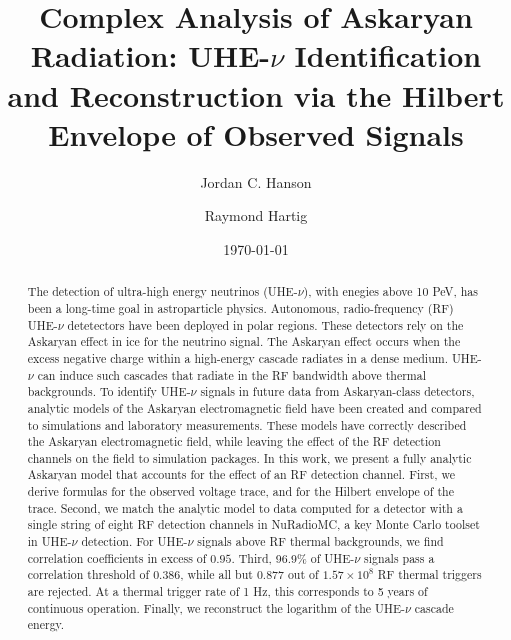 \documentclass[amsmath,amssymb,aps,prd,10pt,twocolumn,showkeys]{revtex4}
\begin{document}
\title{Complex Analysis of Askaryan Radiation: UHE-$\nu$ Identification and Reconstruction via the Hilbert Envelope of Observed Signals}

\author{Jordan C. Hanson}
\author{Raymond Hartig}
\date{\today}

\begin{abstract}
The detection of ultra-high energy neutrinos (UHE-$\nu$), with enegies above 10 PeV, has been a long-time goal in astroparticle physics.  Autonomous, radio-frequency (RF) UHE-$\nu$ detetectors have been deployed in polar regions.  These detectors rely on the Askaryan effect in ice for the neutrino signal.  The Askaryan effect occurs when the excess negative charge within a high-energy cascade radiates in a dense medium.  UHE-$\nu$ can induce such cascades that radiate in the RF bandwidth above thermal backgrounds.  To identify UHE-$\nu$ signals in future data from Askaryan-class detectors, analytic models of the Askaryan electromagnetic field have been created and compared to simulations and laboratory measurements.  These models have correctly described the Askaryan electromagnetic field, while leaving the effect of the RF detection channels on the field to simulation packages.  In this work, we present a fully analytic Askaryan model that accounts for the effect of an RF detection channel.  First, we derive formulas for the observed voltage trace, and for the Hilbert envelope of the trace.  Second, we match the analytic model to data computed for a detector with a single string of eight RF detection channels in NuRadioMC, a key Monte Carlo toolset in UHE-$\nu$ detection.  For UHE-$\nu$ signals above RF thermal backgrounds, we find correlation coefficients in excess of $0.95$.  Third, 96.9\% of UHE-$\nu$ signals pass a correlation threshold of 0.386, while all but 0.877 out of $1.57 \times 10^8$ RF thermal triggers are rejected.  At a thermal trigger rate of 1 Hz, this corresponds to 5 years of continuous operation.  Finally, we reconstruct the logarithm of the UHE-$\nu$ cascade energy.
\end{abstract}


\maketitle
\end{document}
